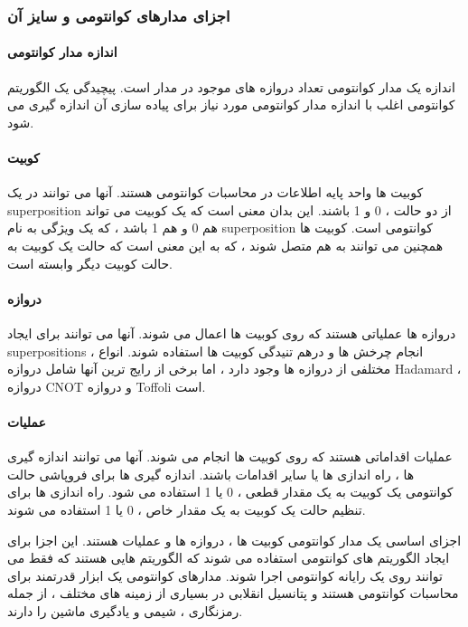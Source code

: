 \documentclass{book}
\begin{document}
\subsubsection{اجزای مدار‌های کوانتومی و سایز آن }
\paragraph{اندازه مدار کوانتومی}

اندازه یک مدار کوانتومی تعداد دروازه های موجود در مدار است. پیچیدگی یک الگوریتم کوانتومی اغلب با اندازه مدار کوانتومی مورد نیاز برای پیاده سازی آن اندازه گیری می شود.


\paragraph{کوبیت}

کوبیت ها واحد پایه اطلاعات در محاسبات کوانتومی هستند. آنها می توانند در یک superposition از دو حالت ، 0 و 1 باشند. این بدان معنی است که یک کوبیت می تواند هم 0 و هم 1 باشد ، که یک ویژگی به نام superposition کوانتومی است. کوبیت ها همچنین می توانند به هم متصل شوند ، که به این معنی است که حالت یک کوبیت به حالت کوبیت دیگر وابسته است.
\paragraph{دروازه}
دروازه ها عملیاتی هستند که روی کوبیت ها اعمال می شوند. آنها می توانند برای ایجاد superpositions ، انجام چرخش ها و درهم تنیدگی کوبیت ها استفاده شوند. انواع مختلفی از دروازه ها وجود دارد ، اما برخی از رایج ترین آنها شامل دروازه Hadamard ، دروازه CNOT و دروازه Toffoli است.

\paragraph{عملیات}

عملیات اقداماتی هستند که روی کوبیت ها انجام می شوند. آنها می توانند اندازه گیری ها ، راه اندازی ها یا سایر اقدامات باشند. اندازه گیری ها برای فروپاشی حالت کوانتومی یک کوبیت به یک مقدار قطعی ، 0 یا 1 استفاده می شود. راه اندازی ها برای تنظیم حالت یک کوبیت به یک مقدار خاص ، 0 یا 1 استفاده می شوند.




اجزای اساسی یک مدار کوانتومی کوبیت ها ، دروازه ها و عملیات هستند. این اجزا برای ایجاد الگوریتم های کوانتومی استفاده می شوند که الگوریتم هایی هستند که فقط می توانند روی یک رایانه کوانتومی اجرا شوند. مدارهای کوانتومی یک ابزار قدرتمند برای محاسبات کوانتومی هستند و پتانسیل انقلابی در بسیاری از زمینه های مختلف ، از جمله رمزنگاری ، شیمی و یادگیری ماشین را دارند.
\end{document}
